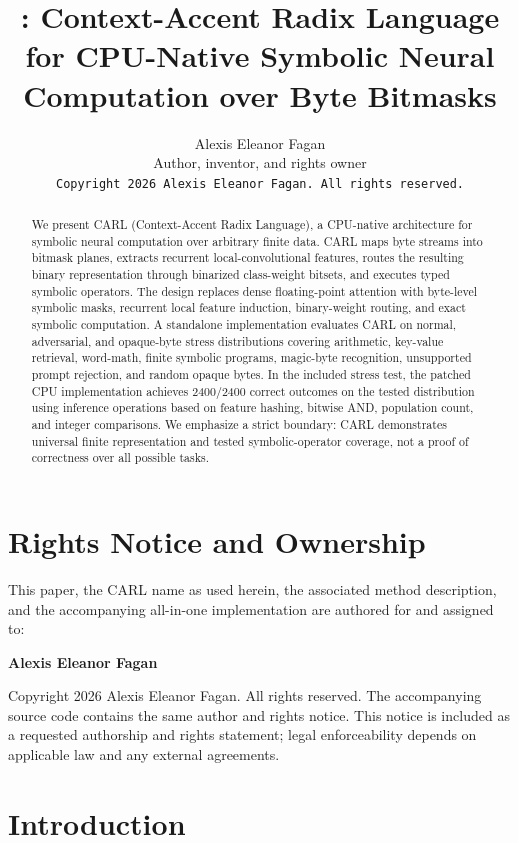 \documentclass[10pt]{article}
\title{\vspace{-1.0em}
\CARL: Context-Accent Radix Language for CPU-Native Symbolic Neural Computation over Byte Bitmasks
}
\author{
Alexis Eleanor Fagan\\
Author, inventor, and rights owner\\
\texttt{Copyright \textcopyright{} 2026 Alexis Eleanor Fagan. All rights reserved.}
}
\date{}
\newcommand{\CARL}{\textsc{CARL}}
\begin{document}
\maketitle

\begin{abstract}
We present \CARL{} (Context-Accent Radix Language), a CPU-native architecture for symbolic neural computation over arbitrary finite data. \CARL{} maps byte streams into bitmask planes, extracts recurrent local-convolutional features, routes the resulting binary representation through binarized class-weight bitsets, and executes typed symbolic operators. The design replaces dense floating-point attention with byte-level symbolic masks, recurrent local feature induction, binary-weight routing, and exact symbolic computation. A standalone implementation evaluates \CARL{} on normal, adversarial, and opaque-byte stress distributions covering arithmetic, key-value retrieval, word-math, finite symbolic programs, magic-byte recognition, unsupported prompt rejection, and random opaque bytes. In the included stress test, the patched CPU implementation achieves 2400/2400 correct outcomes on the tested distribution using inference operations based on feature hashing, bitwise AND, population count, and integer comparisons. We emphasize a strict boundary: \CARL{} demonstrates universal finite representation and tested symbolic-operator coverage, not a proof of correctness over all possible tasks.
\end{abstract}

\section{Rights Notice and Ownership}

This paper, the \CARL{} name as used herein, the associated method description, and the accompanying all-in-one implementation are authored for and assigned to:

\begin{center}
\textbf{Alexis Eleanor Fagan}
\end{center}

Copyright \textcopyright{} 2026 Alexis Eleanor Fagan. All rights reserved. The accompanying source code contains the same author and rights notice. This notice is included as a requested authorship and rights statement; legal enforceability depends on applicable law and any external agreements.

\section{Introduction}
\end{document}
